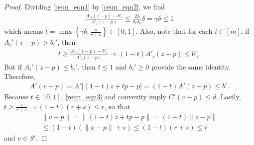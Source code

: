 \begin{proof}


Dividing \cref{reun_eqn1} by \cref{reun_eqn2}, we find
\begin{align*}
\frac{A'_i (z - p) - b'_i}{A'_i (z - p)} \le \frac{2\lambda}{\delta_r \delta_u}\delta = \gamma \delta \le 1
\end{align*}
which means $t = \max\left\{\gamma \delta, \frac{s}{r+s}\right\} \in [0, 1]$.
Also, note that for each $i \in [m]$, if $A_i'(z - p) > b_i'$, then
\begin{align*}
t \ge \frac{A'_i (z - p) - b'_i}{A'_i (z - p)}
\Longrightarrow (1-t) A'_i (z - p) \le b'_i.
\end{align*}
But if $A_i'(z - p) \le b_i'$, then $t \le 1$ and $b_i' \ge 0$ provide the same identity.
Therefore, 
\begin{align*}
A'(v - p) = A' \bigg[(1-t) z + tp - p\bigg] = (1-t) A' (z - p) \le b'.
\end{align*}
Because $t \in [0, 1]$, \cref{reun_eqn3} and convexity imply $C'(v - p) \le d$.
Lastly, $t \ge \frac{s}{r + s} \Longrightarrow (1 - t) \left(r + s\right) \le r$, so that
\begin{align*}
\|v - p\| 
= \|(1-t)z + t p - p\| 
= (1 - t) \|z - p\| \\
\le (1 - t) \left(\|x - p\| + s\right) 
\le (1 - t) \left(r + s\right) 
\le r
\end{align*}
and $v \in S'$.


\end{proof}
